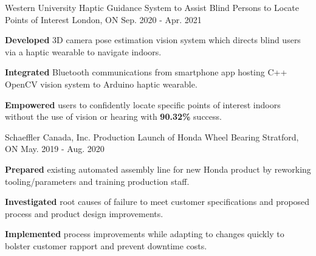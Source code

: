 

\begin{cventries}

  \cventry
    {Western University} %
    {Haptic Guidance System to Assist Blind Persons to Locate Points of Interest} %
    {London, ON} %
    {Sep. 2020 - Apr. 2021} %
    {
      \begin{cvitems} %
        \item {\textbf{Developed} 3D camera pose estimation vision system which directs blind users via a haptic wearable to navigate indoors.}
        \item {\textbf{Integrated} Bluetooth communications from smartphone app hosting C++ OpenCV vision system to Arduino haptic wearable.}
        \item {\textbf{Empowered} users to confidently locate specific points of interest indoors without the use of vision or hearing with \textbf{90.32\%} success.}
      \end{cvitems}
    }

\cventry
{Schaeffler Canada, Inc.} %
{Production Launch of Honda Wheel Bearing } %
{Stratford, ON} %
{May. 2019 - Aug. 2020} %
{
  \begin{cvitems} %
    \item {\textbf{Prepared} existing automated assembly line for new Honda product by reworking tooling/parameters and training production staff.}
    \item {\textbf{Investigated} root causes of failure to meet customer specifications and proposed process and product design improvements.}
    \item {\textbf{Implemented} process improvements while adapting to changes quickly to bolster customer rapport and prevent downtime costs.}
  \end{cvitems}
}

\end{cventries}
